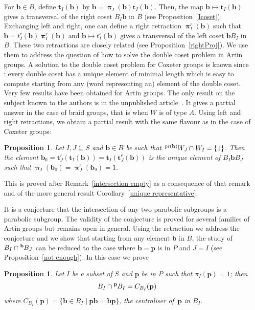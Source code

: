 \documentclass{amsart}
\numberwithin{equation}{section}
\newtheorem{proposition}[equation]{Proposition}
\newcommand\lexp[2]{\kern\scriptspace\vphantom{#2}^{#1}\kern-\scriptspace#2}
\newcommand\bb{{\mathbf b}}
\newcommand\bp{{\mathbf p}}
\newcommand\bt{{\mathbf t}}
\DeclareMathOperator\pr{pr}
\DeclareMathOperator\bpi{\boldsymbol\pi}
\begin{document}
For  $\bb\in B$, define $\bt_I(\bb)$  by $\bb=\bpi_I(\bb)\bt_I(\bb)$. Then, the
map $\bb\mapsto \bt_I(\bb)$ gives a transversal of the right coset $B_I\bb$ in
$B$  (see  Proposition~\ref{Icoset}).  Exchanging  left  and right, one can
define a right retraction $\bpi^r_I(\bb)$ such that $ \bb =
t^r_I(\bb)\bpi^r_I(\bb)$ and $\bb\mapsto t^r_I(\bb)$ gives a transversal of
the  left coset $\bb B_I$ in $B$. These two retractions are closely related
(see Proposition~\ref{rightProj}). We use them to
address  the question  of how  to solve  the double  coset problem in Artin
groups.  A solution to the double coset problem for Coxeter groups is known
since \cite{Bbk}: every double coset has a unique element of minimal length
which  is easy to compute starting  from any (word representing an) element
of  the double coset. Very few results have been obtained for Artin groups.
The  only result on the subject known  to the authors is in the unpublished
article~\cite{Kalkaetall}.  It gives a partial answer  in the case of braid
groups, that is  when $W$  is of  type $A$. Using left and
right  retractions, we obtain a partial result with the same flavour as in the
case of Coxeter groups:

\begin{proposition}\label{propIntro3}
Let  $I,J\subseteq S$ and $\bb\in B$ be such that $\lexp{\pr(\bb)}W_J\cap W_I =\{1\}
$. Then the element $\bb_0=\bt_J^r(\bt_I(\bb))=\bt_I(\bt_J^r(\bb))$ is the
unique element of $B_I\bb B_J$ such that $\bpi_I(\bb_0)=\bpi_J^r(\bb_0)=1$.
\end{proposition}
This is proved after Remark~\ref{intersection empty}
as a consequence of that remark and of the
more general result  Corollary~\ref{unique representative}.

It is a conjecture that the intersection of any two parabolic subgroups is
a parabolic subgroup.  The validity of the conjecture is proved for several families
of Artin groups \cite{AntolinFoniqi,CumplidoetAll3,CumplidoetAll,CumplidoetAll2,Morris-Wright}
but remains open in general.  Using the retraction we address the
conjecture and we show that 
starting from any element $\bb$ in $B$,  the study of $B_I\cap\lexp \bb B_J$ can be
reduced to the case where $\bb = \bp$ is in $P$ and $J = I$
(see Proposition~\ref{not enough}). In this case we prove
\begin{proposition}\label{propIntro4}
Let   $I$  be a  subset   of  $S$  and   $\bp$ be in $P$ such that 
$\pi_I(\bp)=1$; then   $$B_I\cap \lexp\bp B_I=C_{B_I}(\bp)$$
where   $C_{B_I}(\bp) = \{\bb\in B_I\mid \bp\bb = \bb\bp\}$,
the centraliser of~$\bp$  in $B_I$. 
\end{proposition}
 
\end{document}
